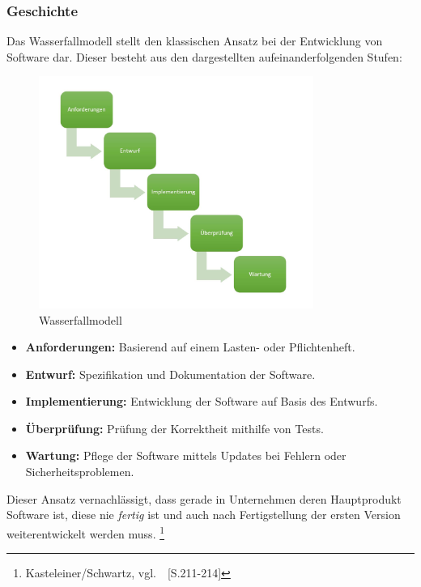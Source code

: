 \subsubsection{Geschichte}\label{devops_geschichte}

Das Wasserfallmodell stellt den klassischen Ansatz bei der Entwicklung von Software dar.
Dieser besteht aus den dargestellten aufeinanderfolgenden Stufen:

\begin{figure}[htb]
    \centering
    \includegraphics[width=0.8\textwidth]{images/wasserfall.jpg}
    \caption[Wasserfallmodell]{Wasserfallmodell}
    \label{fig:Wasserfallmodell}
\end{figure}

\begin{itemize}
    \item \textbf{Anforderungen:} Basierend auf einem Lasten- oder Pflichtenheft.
    \item \textbf{Entwurf:} Spezifikation und Dokumentation der Software.
    \item \textbf{Implementierung:} Entwicklung der Software auf Basis des Entwurfs.
    \item \textbf{Überprüfung:} Prüfung der Korrektheit mithilfe von Tests.
    \item \textbf{Wartung:} Pflege der Software mittels Updates bei Fehlern oder Sicherheitsproblemen.
\end{itemize}

Dieser Ansatz vernachlässigt, dass gerade in Unternehmen deren Hauptprodukt Software ist,
diese nie \textsl{fertig} ist und auch nach Fertigstellung der ersten Version weiterentwickelt werden muss.
\footnote{Kasteleiner/Schwartz, vgl.~\cite{Kasteleiner2019}~[S.211-214]}

